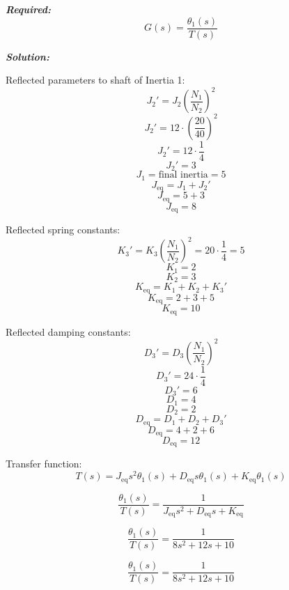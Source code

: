 \documentclass[11pt]{article}
\begin{document}
\vspace{12pt}

\noindent \textbf{\textit{Required:}}
\[
G(s) = \frac{\theta_1(s)}{T(s)}
\]

\vspace{12pt}


\noindent\textbf{\textit{Solution:}}

Reflected parameters to shaft of Inertia 1:
\[
J_2' = J_2 \left( \frac{N_1}{N_2} \right)^2 
\]
\[
J_2' = 12 \cdot \left( \frac{20}{40} \right)^2 
\]
\[
J_2' = 12 \cdot \frac{1}{4} 
\]
\[
J_2' = 3
\]
\[
J_1 = \text{final inertia} = 5
\]
\[
J_{\text{eq}} = J_1 + J_2' 
\]
\[
J_{\text{eq}} = 5 + 3 
\]
\[
J_{\text{eq}} = 8
\]

Reflected spring constants:
\[
K_3' = K_3 \left( \frac{N_1}{N_2} \right)^2 = 20 \cdot \frac{1}{4} = 5
\]
\[
K_1 = 2
\]
\[
K_2 = 3
\]
\[
K_{\text{eq}} = K_1 + K_2 + K_3' 
\]
\[
K_{\text{eq}} = 2 + 3 + 5 
\]
\[
K_{\text{eq}} = 10
\]

Reflected damping constants:
\[
D_3' = D_3 \left( \frac{N_1}{N_2} \right)^2 
\]
\[
D_3' = 24 \cdot \frac{1}{4} 
\]
\[
D_3' = 6
\]
\[
D_1 = 4
\]
\[
D_2 = 2
\]
\[
D_{\text{eq}} = D_1 + D_2 + D_3' 
\]
\[
D_{\text{eq}} = 4 + 2 + 6 
\]
\[
D_{\text{eq}} = 12
\]

Transfer function:
\[
T(s) = J_{\text{eq}} s^2 \theta_1(s) + D_{\text{eq}} s \theta_1(s) + K_{\text{eq}} \theta_1(s)
\]

\[
\frac{\theta_1(s)}{T(s)} = \frac{1}{J_{\text{eq}} s^2 + D_{\text{eq}} s + K_{\text{eq}}}
\]

\[
\frac{\theta_1(s)}{T(s)} = \frac{1}{8 s^2 + 12 s + 10}
\]

\[
\boxed{\frac{\theta_1(s)}{T(s)} = \frac{1}{8 s^2 + 12 s + 10}}
\]

\end{document}
